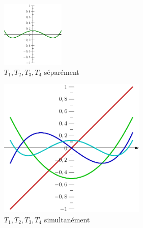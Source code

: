 \begin{enumerate}
\begin{figure}
 \includegraphics[width=3cm]{Cchebydiam_4.pdf}
 \caption{$T_1, T_2, T_3, T_4$ séparément}
 \label{fig:Cchebydiam_1}
\end{figure}
\begin{figure}
 \centering
 \includegraphics[width=7cm]{Cchebydiam_5.pdf}
 \caption{$T_1, T_2, T_3, T_4$ simultanément}
 \label{fig:Cchebydiam_5}
\end{figure}


\end{enumerate}
